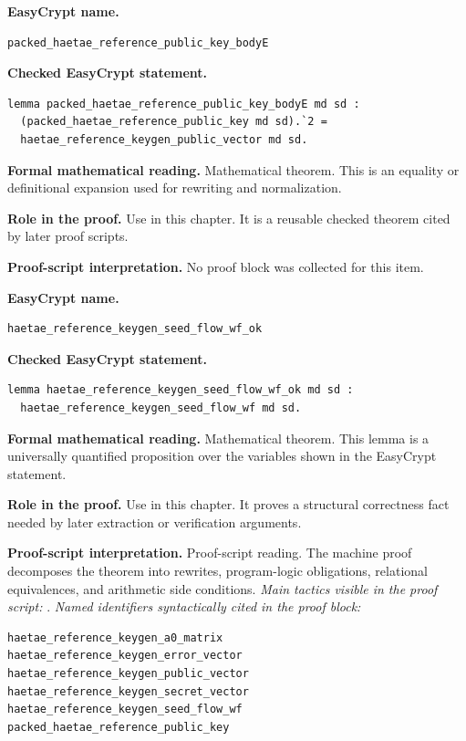 \begin{formaltheorem}
\noindent\textbf{EasyCrypt name.}
\begin{lstlisting}[language=EasyCrypt,basicstyle=\ttfamily\scriptsize]
packed_haetae_reference_public_key_bodyE
\end{lstlisting}
\noindent\textbf{Checked EasyCrypt statement.}
\begin{lstlisting}[language=EasyCrypt,basicstyle=\ttfamily\scriptsize]
lemma packed_haetae_reference_public_key_bodyE md sd :
  (packed_haetae_reference_public_key md sd).`2 =
  haetae_reference_keygen_public_vector md sd.
\end{lstlisting}
\noindent\textbf{Formal mathematical reading.}
Mathematical theorem. This is an equality or definitional expansion used for rewriting and normalization.

\noindent\textbf{Role in the proof.}
Use in this chapter. It is a reusable checked theorem cited by later proof scripts.

\noindent\textbf{Proof-script interpretation.}
No proof block was collected for this item.

\end{formaltheorem}

\begin{formaltheorem}
\noindent\textbf{EasyCrypt name.}
\begin{lstlisting}[language=EasyCrypt,basicstyle=\ttfamily\scriptsize]
haetae_reference_keygen_seed_flow_wf_ok
\end{lstlisting}
\noindent\textbf{Checked EasyCrypt statement.}
\begin{lstlisting}[language=EasyCrypt,basicstyle=\ttfamily\scriptsize]
lemma haetae_reference_keygen_seed_flow_wf_ok md sd :
  haetae_reference_keygen_seed_flow_wf md sd.
\end{lstlisting}
\noindent\textbf{Formal mathematical reading.}
Mathematical theorem. This lemma is a universally quantified proposition over the variables shown in the EasyCrypt statement.

\noindent\textbf{Role in the proof.}
Use in this chapter. It proves a structural correctness fact needed by later extraction or verification arguments.

\noindent\textbf{Proof-script interpretation.}
Proof-script reading. The machine proof decomposes the theorem into rewrites, program-logic obligations, relational equivalences, and arithmetic side conditions.
\emph{Main tactics visible in the proof script:} .
\emph{Named identifiers syntactically cited in the proof block:}
\begin{lstlisting}[language=EasyCrypt,basicstyle=\ttfamily\scriptsize]
haetae_reference_keygen_a0_matrix
haetae_reference_keygen_error_vector
haetae_reference_keygen_public_vector
haetae_reference_keygen_secret_vector
haetae_reference_keygen_seed_flow_wf
packed_haetae_reference_public_key
\end{lstlisting}

\end{formaltheorem}

